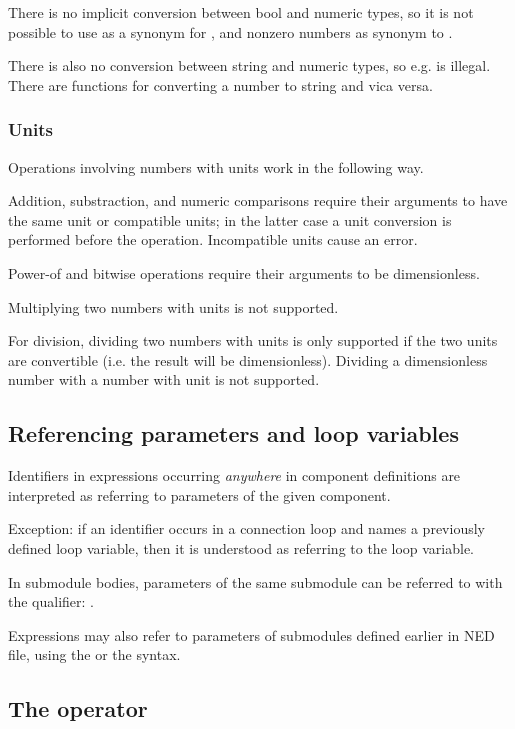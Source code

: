 There is no implicit conversion between bool and numeric types, so it is
not possible to use  as a synonym for , and nonzero numbers
as synonym to .

There is also no conversion between string and numeric types, so e.g. 
is illegal. There are functions for converting a number to string and vica versa.

\subsubsection{Units}

Operations involving numbers with units work in the following way.

Addition, substraction, and numeric comparisons require their arguments to
have the same unit or compatible units; in the latter case a unit conversion
is performed before the operation. Incompatible units cause an error.

Power-of and bitwise operations require their arguments to be dimensionless.

Multiplying two numbers with units is not supported.

For division, dividing two numbers with units is only supported if the two
units are convertible (i.e. the result will be dimensionless). Dividing
a dimensionless number with a number with unit is not supported.


\subsection{Referencing parameters and loop variables}

Identifiers in expressions occurring \textit{anywhere} in component definitions
are interpreted as referring to parameters of the given component.

Exception: if an identifier occurs in a connection  loop and names
a previously defined loop variable, then it is understood as referring to
the loop variable.

In submodule bodies, parameters of the same submodule can be referred to
with the  qualifier: .

Expressions may also refer to parameters of submodules defined earlier
in NED file, using the  or the
 syntax.


\subsection{The  operator}

